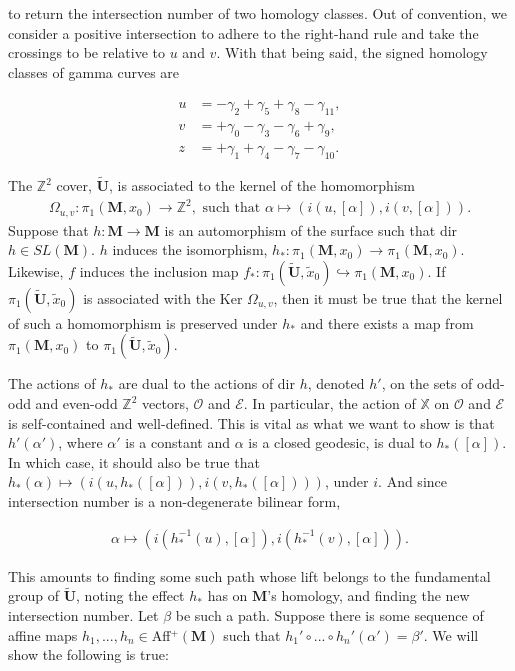 \documentclass[]{article}
\begin{document}
to return the intersection number of two homology classes. Out of convention, we consider a positive intersection to adhere to the right-hand rule and take the crossings to be relative to $u$ and $v$. With that being said, the signed homology classes of gamma curves are

\begin{align*}
u &= -\gamma_2 +\gamma_5 + \gamma_8 - \gamma_{11},\\
v &= +\gamma_0 -\gamma_3 -\gamma_6 +\gamma_9,\\
z &= +\gamma_1 +\gamma_4-\gamma_7-\gamma_{10}.
\end{align*}


The $\mathbb{Z}^2$ cover, $\tilde{\mathbf{U}}$, is associated to the kernel of the homomorphism
\begin{align}
\Omega_{u,v}:\pi_1(\mathbf{M},x_0)\rightarrow \mathbb{Z}^2, \text{ such that } \alpha\mapsto(i(u,[\alpha]),i(v,[\alpha])).
\end{align}
Suppose that $h:\mathbf{M}\rightarrow\mathbf{M}$ is an automorphism of the surface such that dir $h\in SL(\mathbf M)$. $h$ induces the isomorphism, $h_*:\pi_1(\mathbf{M},x_0)\rightarrow \pi_1(\mathbf{M},x_0)$. Likewise, $f$ induces the inclusion map $f_*:\pi_1(\tilde{\mathbf{U}},\tilde x_0)\hookrightarrow\pi_1(\mathbf{M},x_0)$. If $\pi_1(\tilde{\mathbf{U}},\tilde x_0)$ is associated with the Ker $\Omega_{u,v}$, then it must be true that the kernel of such a homomorphism is preserved under $h_*$ and there exists a map from  $\pi_1(\mathbf M, x_0)$ to $\pi_1(\tilde{\mathbf{U}},\tilde x_0)$.

The actions of $h_*$ are dual to the actions of dir $h$, denoted $h'$, on the sets of odd-odd and even-odd $\mathbb{Z}^2$ vectors, $\mathcal{O}$ and $\mathcal{E}$. In particular, the action of $\mathbb X$ on $\mathcal{O}$ and $\mathcal{E}$ is self-contained and well-defined. This is vital as what we want to show is that $h'(\alpha')$, where $\alpha'$ is a constant and $\alpha$ is a closed geodesic, is dual to $h_*([\alpha])$. In which case, it should also be true that $h_*(\alpha)\mapsto(i(u,h_*([\alpha])),i(v,h_*([\alpha])))$, under $i$. And since intersection number is a non-degenerate bilinear form, 

\begin{align*}
\alpha\mapsto(i(h_*^{-1}(u),[\alpha]),i(h_*^{-1}(v),[\alpha])).
\end{align*}

This amounts to finding some such path whose lift belongs to the fundamental group of $\tilde{\mathbf U}$, noting the effect $h_*$ has on $\mathbf M$'s homology, and finding the new intersection number. Let $\beta$ be such a path. Suppose there is some sequence of affine maps $h_1,...,h_n\in$Aff$^+(\mathbf{M})$ such that $h_1' \circ ... \circ h_n'(\alpha')=\beta'$. We will show the following is true:
\end{document}
